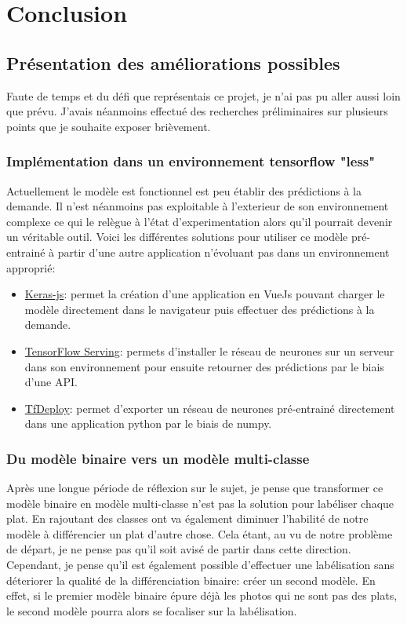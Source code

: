 \documentclass[a4paper,12pt]{report}
\begin{document}
  \chapter{Conclusion}

    \section{Présentation des améliorations possibles}
    Faute de temps et du défi que représentais ce projet, je n'ai pas pu aller aussi loin que prévu. J'avais néanmoins effectué des recherches préliminaires sur plusieurs points que je souhaite exposer brièvement.

      \subsection{Implémentation dans un environnement tensorflow "less"}
      Actuellement le modèle est fonctionnel est peu établir des prédictions à la demande. Il n'est néanmoins pas exploitable à l'exterieur de son environnement complexe ce qui le relègue à l'état d'experimentation alors qu'il pourrait devenir un véritable outil. 
      \medbreak
      Voici les différentes solutions pour utiliser ce modèle pré-entrainé à partir d'une autre application n'évoluant pas dans un environnement approprié:
      \begin{itemize}
        \item \href{https://github.com/transcranial/keras-js/blob/master/README.md}{Keras-js}: permet la création d'une application en VueJs pouvant charger le modèle directement dans le navigateur puis effectuer des prédictions à la demande.
        \item \href{https://www.tensorflow.org/deploy/tfserve}{TensorFlow Serving}: permets d'installer le réseau de neurones sur un serveur dans son environnement pour ensuite retourner des prédictions par le biais d'une API.
        \item \href{https://github.com/riga/tfdeploy}{TfDeploy}: permet d'exporter un réseau de neurones pré-entrainé directement dans une application python par le biais de numpy.
      \end{itemize}

      \subsection{Du modèle binaire vers un modèle multi-classe}
      Après une longue période de réflexion sur le sujet, je pense que transformer ce modèle binaire en modèle multi-classe n'est pas la solution pour labéliser chaque plat. En rajoutant des classes ont va également diminuer l'habilité de notre modèle à différencier un plat d'autre chose. Cela étant, au vu de notre problème de départ, je ne pense pas qu'il soit avisé de partir dans cette direction. 
      \medbreak
      Cependant, je pense qu'il est également possible d'effectuer une labélisation sans déteriorer la qualité de la différenciation binaire: créer un second modèle. En effet, si le premier modèle binaire épure déjà les photos qui ne sont pas des plats, le second modèle pourra alors se focaliser sur la labélisation.
\end{document}
